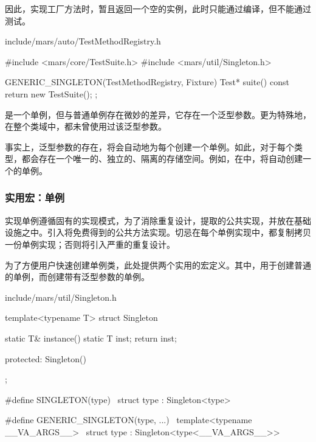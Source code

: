 \begin{content}
因此，实现工厂方法时，暂且返回一个空的实例，此时只能通过编译，但不能通过测试。

\begin{nodiff}{include/mars/auto/TestMethodRegistry.h}
 \begin{c++}
#include <mars/core/TestSuite.h>
#include <mars/util/Singleton.h>

GENERIC_SINGLETON(TestMethodRegistry, Fixture) {
  Test* suite() const {
    return new TestSuite();
  }
};
 \end{c++}
\end{nodiff}

是一个单例，但与普通单例存在微妙的差异，它存在一个泛型参数。更为特殊地，在整个类域中，都未曾使用过该泛型参数。

事实上，泛型参数的存在，将会自动地为每个创建一个单例。如此，对于每个类型，都会存在一个唯一的、独立的、隔离的存储空间。例如，在中，将自动创建一个的单例。

\subsubsection{实用宏：单例}

实现单例遵循固有的实现模式，为了消除重复设计，提取的公共实现，并放在基础设施之中。引入将免费得到的公共方法实现。切忌在每个单例实现中，都复制拷贝一份单例实现；否则将引入严重的重复设计。

为了方便用户快速创建单例类，此处提供两个实用的宏定义。其中，用于创建普通的单例，而创建带有泛型参数的单例。

\begin{nodiff}{include/mars/util/Singleton.h}
 \begin{c++}
template<typename T>
struct Singleton {
  static T& instance() {
    static T inst;
    return inst;
  }

protected:
  Singleton() {}
};

#define SINGLETON(type) \
  struct type : Singleton<type>

#define GENERIC_SINGLETON(type, ...)         \
  template<typename __VA_ARGS__>             \
  struct type : Singleton<type<__VA_ARGS__>>
 \end{c++}
\end{nodiff}


\end{content}
